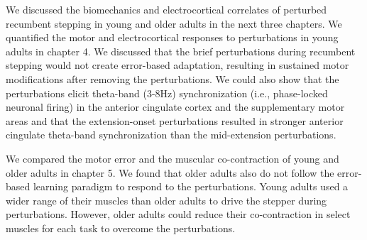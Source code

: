 \documentclass[../thesis_seyed.tex]{subfiles}
\begin{document}
We discussed the biomechanics and electrocortical correlates of perturbed recumbent stepping in young and older adults in the next three chapters. We quantified the motor and electrocortical responses to perturbations in young adults in chapter 4. We discussed that the brief perturbations during recumbent stepping would not create error-based adaptation, resulting in sustained motor modifications after removing the perturbations. We could also show that the perturbations elicit theta-band (3-8Hz) synchronization (i.e., phase-locked neuronal firing) in the anterior cingulate cortex and the supplementary motor areas and that the extension-onset perturbations resulted in stronger anterior cingulate theta-band synchronization than the mid-extension perturbations.

We compared the motor error and the muscular co-contraction of young and older adults in chapter 5. We found that older adults also do not follow the error-based learning paradigm to respond to the perturbations. Young adults used a wider range of their muscles than older adults to drive the stepper during perturbations. However, older adults could reduce their co-contraction in select muscles for each task to overcome the perturbations.




\end{document}
